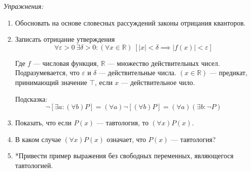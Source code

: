 	{\it Упражнения:}
\begin{enumerate}
	\item{}Обосновать на основе словесных рассуждений законы отрицания
	кванторов\label{ex:quantor_neg_def}.
	\item{}Записать отрицание утверждения
	\[
		\forall \varepsilon>0~\exists \delta>0:
		(\forall x\in\mathbb{R})~[|x|<\delta\implies |f(x)|<\varepsilon]
	\]

	Где $f$ --- числовая функция, $\mathbb{R}$ --- множество действительных чисел.
	Подразумевается, что $\varepsilon$ и $\delta$ --- действительные числа.
	${(x\in\mathbb{R})}$ --- предикат, принимающий значение $\top$,
	если $x$ --- действительное чило.

	Подсказка:
	\[
		\lnot[\exists a:(\forall b)P]=(\forall a)\lnot[(\forall b)P]=
		(\forall a)(\exists b:\lnot P)
	\]

	\item{}Показать, что если $P(x)$ --- тавтология, то $(\forall x)P(x)$.

	\item{}В каком случае $(\forall x)P(x)$ означает, что $P(x)$ --- тавтология?

	\item{}*Привести пример выражения без свободных переменных,
	являющегося тавтологией.
\end{enumerate}

